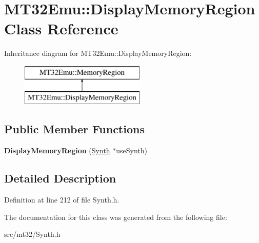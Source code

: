 \hypertarget{classMT32Emu_1_1DisplayMemoryRegion}{\section{M\-T32\-Emu\-:\-:Display\-Memory\-Region Class Reference}
\label{classMT32Emu_1_1DisplayMemoryRegion}
}
Inheritance diagram for M\-T32\-Emu\-:\-:Display\-Memory\-Region\-:\begin{figure}[H]
\begin{center}
\leavevmode
\includegraphics[height=2.000000cm]{classMT32Emu_1_1DisplayMemoryRegion}
\end{center}
\end{figure}
\subsection*{Public Member Functions}
\begin{DoxyCompactItemize}
\item 
\hypertarget{classMT32Emu_1_1DisplayMemoryRegion_a07119d8f9381630484314c9fe31b3a90}{{\bfseries Display\-Memory\-Region} (\hyperlink{classMT32Emu_1_1Synth}{Synth} $\ast$use\-Synth)}\label{classMT32Emu_1_1DisplayMemoryRegion_a07119d8f9381630484314c9fe31b3a90}

\end{DoxyCompactItemize}


\subsection{Detailed Description}


Definition at line 212 of file Synth.\-h.



The documentation for this class was generated from the following file\-:\begin{DoxyCompactItemize}
\item 
src/mt32/Synth.\-h\end{DoxyCompactItemize}
